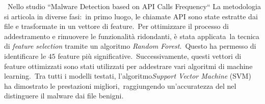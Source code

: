 \
Nello studio ``Malware Detection based on API Calls Frequency`` La metodologia si articola in diverse fasi:\
in primo luogo, le chiamate API sono state estratte dai file e trasformate in un vettore di feature.\
Per ottimizzare il processo di addestramento e rimuovere le funzionalità ridondanti, è stata applicata\
la tecnica di \textit{feature selection} tramite un algoritmo \textit{Random Forest}.\
Questo ha permesso di identificare le $45$ feature più significative.\
Successivamente, questi vettori di feature ottimizzati sono stati utilizzati per addestrare vari algoritmi di machine learning.\
Tra tutti i modelli testati, l'algoritmo\textit{Support Vector Machine} (SVM) ha dimostrato le prestazioni migliori,\
raggiungendo un'accuratezza del  nel distinguere il malware dai file benigni.

